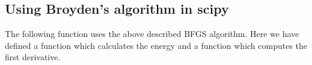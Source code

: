 \documentclass[%
oneside,                 %
final,                   %
10pt]{article}
\begin{document}
\subsection*{Using Broyden's algorithm in scipy}
The following function uses the above described BFGS algorithm. Here we have defined a function which calculates the energy and a function which computes the first derivative.
\end{document}
